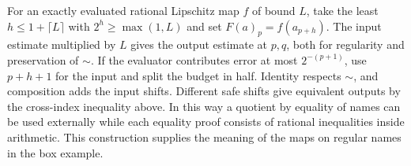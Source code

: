 \documentclass[11pt,letterpaper]{article}
\begin{document}
For an exactly evaluated rational Lipschitz map $f$ of bound $L$, take the least $h\le 1+\lceil L\rceil$ with $2^h\ge\max(1,L)$ and set $F(a)_p=f(a_{p+h})$. The input estimate multiplied by $L$ gives the output estimate at $p,q$, both for regularity and preservation of $\sim$. If the evaluator contributes error at most $2^{-(p+1)}$, use $p+h+1$ for the input and split the budget in half. Identity respects $\sim$, and composition adds the input shifts. Different safe shifts give equivalent outputs by the cross-index inequality above. In this way a quotient by equality of names can be used externally while each equality proof consists of rational inequalities inside arithmetic. This construction supplies the meaning of the maps on regular names in the box example.







\end{document}
